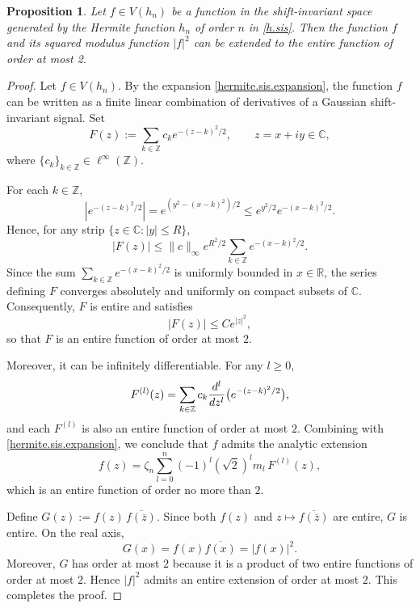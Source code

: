 \documentclass[10pt,a4paper]{amsart}
\newtheorem{prop}{Proposition}
\begin{document}
\begin{prop}\label{hermite.lem}
{\rm Let $f\in V(h_n)$ be a function in the shift-invariant space generated by the Hermite function $h_n$ of order $n$ in \eqref{h.sis}.  Then the function $f$  and its squared modulus function $|f|^2$ can be extended to  the entire function of order at most 2.  }
\end{prop}

\begin{proof} 
Let $f\in V(h_n)$. By the expansion \eqref{hermite.sis.expansion}, the function $f$ can be written
as a finite linear combination of derivatives of a Gaussian shift-invariant signal. 
Set
\[
F(z):=\sum_{k\in\mathbb Z} c_k e^{-(z-k)^2/2}, \qquad z=x+iy\in\mathbb C,
\]
where $\{c_k\}_{k\in\mathbb Z}\in\ell^\infty(\mathbb Z)$.

For each $k\in\mathbb Z$,
\[
|e^{-(z-k)^2/2}|
= e^{(y^2-(x-k)^2)/2}
\le e^{y^2/2} e^{-(x-k)^2/2}.
\]
Hence, for any strip $\{z\in\mathbb C:|y|\le R\}$,
\[
|F(z)|
\le \|c\|_\infty e^{R^2/2}
\sum_{k\in\mathbb Z} e^{-(x-k)^2/2}.
\]
Since the sum $\sum_{k\in\mathbb Z} e^{-(x-k)^2/2}$ is uniformly bounded in
$x\in\mathbb R$, the series defining $F$ converges absolutely and uniformly on compact subsets of $\mathbb C$. Consequently, $F$ is entire and satisfies
\[
|F(z)|\le C e^{|z|^2},
\]
so that $F$ is an entire function of order at most $2$.

Moreover, it can be infinitely differentiable. For any $l\ge 0$,
\[
F^{(l)}(z)=\sum_{k\in\mathbb Z} c_k
\frac{{\rm d}^l}{{\rm d}z^l}\big(e^{-(z-k)^2/2}\big),
\]
and  each $F^{(l)}$ is also an entire function of order at most $2$.
Combining with \eqref{hermite.sis.expansion}, we conclude that $f$ admits the analytic extension
\begin{equation}\label{f.rep}
f(z)=\zeta_n\sum_{l=0}^n (-1)^l(\sqrt2)^l m_l\,F^{(l)}(z),
\end{equation}
which is an entire function of order no more than $2$. 

\smallskip 

Define $G(z):=f(z)\,\overline{f(\overline{z})}$. Since both
$f(z)$ and $z\mapsto\overline{f(\overline{z})}$ are entire, $G$ is entire. On the real axis,
\[
G(x)=f(x)\overline{f(x)}=|f(x)|^2.
\]
Moreover, $G$ has order at most $2$ because it is a product of two entire
functions of order at most $2$. Hence $|f|^2$ admits an entire extension of order at most $2$.  This completes the proof.

\end{proof}
\end{document}
